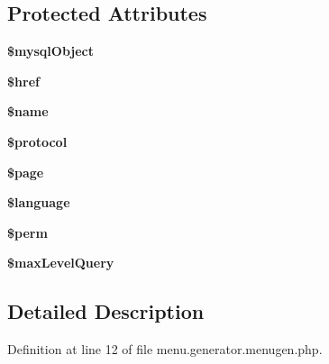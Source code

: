 \subsection*{Protected Attributes}
\begin{DoxyCompactItemize}
\item 
\hypertarget{classmenu_gen_aec66dec69450671d861a4f23e8348b09}{{\bfseries \$mysql\-Object}}\label{classmenu_gen_aec66dec69450671d861a4f23e8348b09}

\item 
\hypertarget{classmenu_gen_ae858fe52917aca7da3e5f64ac5bf665a}{{\bfseries \$href}}\label{classmenu_gen_ae858fe52917aca7da3e5f64ac5bf665a}

\item 
\hypertarget{classmenu_gen_ab2fc40d43824ea3e1ce5d86dee0d763b}{{\bfseries \$name}}\label{classmenu_gen_ab2fc40d43824ea3e1ce5d86dee0d763b}

\item 
\hypertarget{classmenu_gen_ac01bf1cf041487498864d054b991f570}{{\bfseries \$protocol}}\label{classmenu_gen_ac01bf1cf041487498864d054b991f570}

\item 
\hypertarget{classmenu_gen_a0a44e6760141442bb439b1ab1395d8ff}{{\bfseries \$page}}\label{classmenu_gen_a0a44e6760141442bb439b1ab1395d8ff}

\item 
\hypertarget{classmenu_gen_a83170d318260a5a2e2a79dccdd371b10}{{\bfseries \$language}}\label{classmenu_gen_a83170d318260a5a2e2a79dccdd371b10}

\item 
\hypertarget{classmenu_gen_a680d99dc393b3de7d233c61670bef29c}{{\bfseries \$perm}}\label{classmenu_gen_a680d99dc393b3de7d233c61670bef29c}

\item 
\hypertarget{classmenu_gen_ac98296e470680a8cf4239e4acb58c545}{{\bfseries \$max\-Level\-Query}}\label{classmenu_gen_ac98296e470680a8cf4239e4acb58c545}

\end{DoxyCompactItemize}


\subsection{Detailed Description}


Definition at line 12 of file menu.\-generator.\-menugen.\-php.



